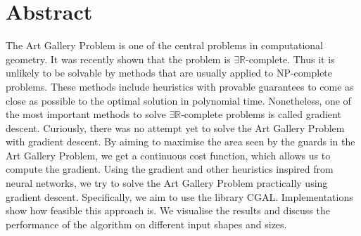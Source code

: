 \section*{Abstract}


The Art Gallery Problem is one of the central problems in computational geometry. It was recently shown that the problem is $\exists \mathbb{R}$-complete. Thus it is unlikely to be solvable by methods that are usually applied to NP-complete problems. These methods include heuristics with provable guarantees to come as close as possible to the optimal solution in polynomial time. Nonetheless, one of the most important methods to solve $\exists \mathbb{R}$-complete problems is called gradient descent. Curiously, there was no attempt yet to solve the Art Gallery Problem with gradient descent. By aiming to maximise the area seen by the guards in the Art Gallery Problem, we get a continuous cost function, which allows us to compute the gradient. Using the gradient and other heuristics inspired from neural networks, we try to solve the Art Gallery Problem practically using gradient descent. Specifically, we aim to use the library CGAL. 
Implementations show how feasible this approach is. We visualise the results and discuss the performance of the algorithm on different input shapes and sizes.